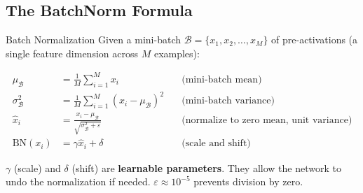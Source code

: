 \subsection{The BatchNorm Formula}

\begin{mathbox}{Batch Normalization}
Given a mini-batch $\mathcal{B} = \{x_1, x_2, \ldots, x_M\}$ of pre-activations (a single feature dimension across $M$ examples):

\begin{align}
    \mu_\mathcal{B} &= \frac{1}{M} \sum_{i=1}^{M} x_i \quad & \text{(mini-batch mean)} \\
    \sigma^2_\mathcal{B} &= \frac{1}{M} \sum_{i=1}^{M} (x_i - \mu_\mathcal{B})^2 \quad & \text{(mini-batch variance)} \\
    \hat{x}_i &= \frac{x_i - \mu_\mathcal{B}}{\sqrt{\sigma^2_\mathcal{B} + \varepsilon}} \quad & \text{(normalize to zero mean, unit variance)} \\
    \text{BN}(x_i) &= \gamma \hat{x}_i + \delta \quad & \text{(scale and shift)}
\end{align}

$\gamma$ (scale) and $\delta$ (shift) are \textbf{learnable parameters}. They allow the network to undo the normalization if needed. $\varepsilon \approx 10^{-5}$ prevents division by zero.
\end{mathbox}


